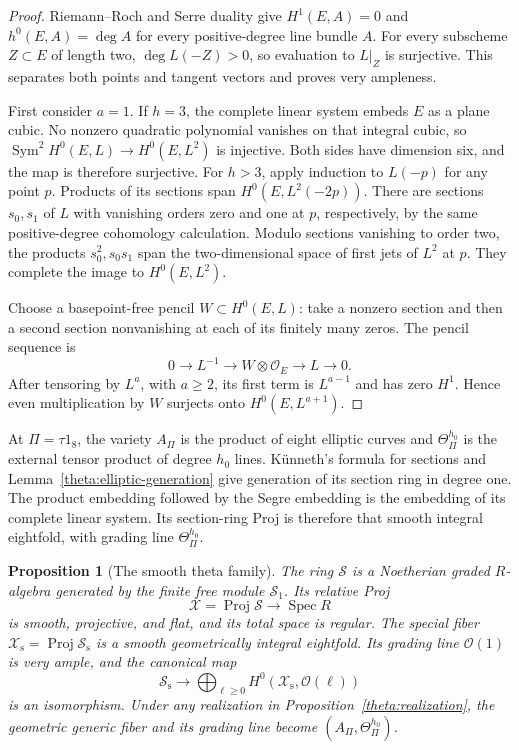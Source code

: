 \documentclass[11pt]{article}
\newtheorem{proposition}[theorem]{Proposition}
\theoremstyle{definition}
\theoremstyle{remark}
\numberwithin{equation}{section}
\begin{document}
\begin{proof}
Riemann--Roch and Serre duality give $H^1(E,A)=0$ and
$h^0(E,A)=\deg A$ for every positive-degree line bundle $A$.
For every subscheme $Z\subset E$ of length two,
$\deg L(-Z)>0$, so evaluation to $L|_Z$ is surjective.
This separates both points and tangent vectors and proves very ampleness.

First consider $a=1$.  If $h=3$, the complete linear system embeds $E$
as a plane cubic.  No nonzero quadratic polynomial vanishes on that
integral cubic, so
$\operatorname{Sym}^2H^0(E,L)\to H^0(E,L^2)$ is injective.
Both sides have dimension six, and the map is therefore surjective.
For $h>3$, apply induction to $L(-p)$ for any point $p$.
Products of its sections span $H^0(E,L^2(-2p))$.
There are sections $s_0,s_1$ of $L$ with vanishing orders zero and one at
$p$, respectively, by the same positive-degree cohomology calculation.
Modulo sections vanishing to order two, the products $s_0^2,s_0s_1$
span the two-dimensional space of first jets of $L^2$ at $p$.
They complete the image to $H^0(E,L^2)$.

Choose a basepoint-free pencil $W\subset H^0(E,L)$: take a nonzero
section and then a second section nonvanishing at each of its finitely
many zeros.  The pencil sequence is
\[
 0\longrightarrow L^{-1}\longrightarrow W\otimes\mathcal O_E
       \longrightarrow L\longrightarrow0.
\]
After tensoring by $L^a$, with $a\geq2$, its first term is $L^{a-1}$
and has zero $H^1$.  Hence even multiplication by $W$ surjects onto
$H^0(E,L^{a+1})$.
\end{proof}

At $\Pi=\tau1_8$, the variety $A_\Pi$ is the product of eight elliptic
curves and $\Theta_\Pi^{h_0}$ is the external tensor product of degree
$h_0$ lines.  K\"unneth's formula for sections and
Lemma~\ref{theta:elliptic-generation} give generation of its section ring
in degree one.  The product embedding followed by the Segre embedding
is the embedding of its complete linear system.  Its section-ring Proj
is therefore that smooth integral eightfold, with grading line
$\Theta_\Pi^{h_0}$.

\begin{proposition}[The smooth theta family]\label{theta:family}
The ring $\mathscr S$ is a Noetherian graded $R$-algebra generated by the
finite free module $\mathscr S_1$.  Its relative Proj
\[
 \mathscr X=\operatorname{Proj}\mathscr S\longrightarrow\operatorname{Spec} R
\]
is smooth, projective, and flat, and its total space is regular.
The special fiber
$\mathscr X_{\mathrm s}=\operatorname{Proj}\mathscr S_{\mathrm s}$ is a smooth
geometrically integral eightfold.  Its grading line $\mathcal O(1)$ is very
ample, and the canonical map
\[
 \mathscr S_{\mathrm s}\longrightarrow
 \bigoplus_{\ell\geq0}H^0(\mathscr X_{\mathrm s},\mathcal O(\ell))
\]
is an isomorphism.  Under any realization in
Proposition~\ref{theta:realization}, the geometric generic fiber and its
grading line become $(A_\Pi,\Theta_\Pi^{h_0})$.
\end{proposition}
\end{document}
